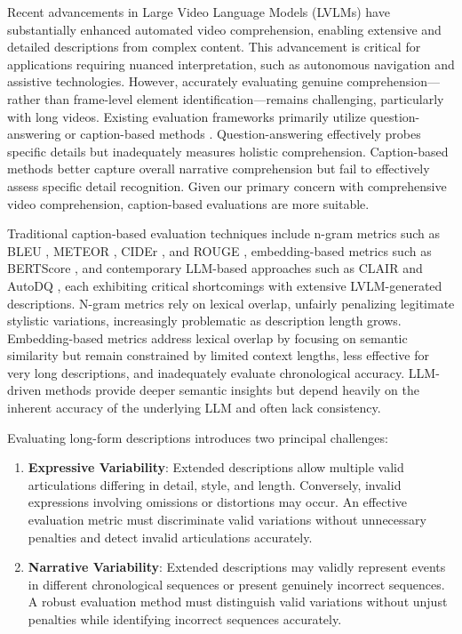 \documentclass[letterpaper]{article} %
\begin{document}
Recent advancements in Large Video Language Models (LVLMs) \citep{Yuan2025Tarsier2,Shen2025LongVU,Ataallah2024Goldfish,Chen2025LongVILA} have substantially enhanced automated video comprehension, enabling extensive and detailed descriptions from complex content. This advancement is critical for applications requiring nuanced interpretation, such as autonomous navigation and assistive technologies. However, accurately evaluating genuine comprehension—rather than frame-level element identification—remains challenging, particularly with long videos. Existing evaluation frameworks primarily utilize question-answering or caption-based methods \citep{wu2024longvideobench,ataallah2024infinibench,mangalam2023egoschema,zhou2025mlvu}. Question-answering effectively probes specific details but inadequately measures holistic comprehension. Caption-based methods better capture overall narrative comprehension but fail to effectively assess specific detail recognition. Given our primary concern with comprehensive video comprehension, caption-based evaluations are more suitable.

Traditional caption-based evaluation techniques include n-gram metrics such as BLEU \citep{p:02}, METEOR \citep{bl:05}, CIDEr \citep{v:15}, and ROUGE \citep{l:04}, embedding-based metrics such as BERTScore \citep{z:20}, and contemporary LLM-based approaches such as CLAIR \citep{chan:23} and AutoDQ \citep{wyzs:24}, each exhibiting critical shortcomings with extensive LVLM-generated descriptions. N-gram metrics rely on lexical overlap, unfairly penalizing legitimate stylistic variations, increasingly problematic as description length grows. Embedding-based metrics address lexical overlap by focusing on semantic similarity but remain constrained by limited context lengths, less effective for very long descriptions, and inadequately evaluate chronological accuracy. LLM-driven methods provide deeper semantic insights but depend heavily on the inherent accuracy of the underlying LLM and often lack consistency.

Evaluating long-form descriptions introduces two principal challenges:
\begin{enumerate}
\item \textbf{Expressive Variability}: Extended descriptions allow multiple valid articulations differing in detail, style, and length. Conversely, invalid expressions involving omissions or distortions may occur. An effective evaluation metric must discriminate valid variations without unnecessary penalties and detect invalid articulations accurately.
\item \textbf{Narrative Variability}: Extended descriptions may validly represent events in different chronological sequences or present genuinely incorrect sequences. A robust evaluation method must distinguish valid variations without unjust penalties while identifying incorrect sequences accurately.
\end{enumerate}
\end{document}
